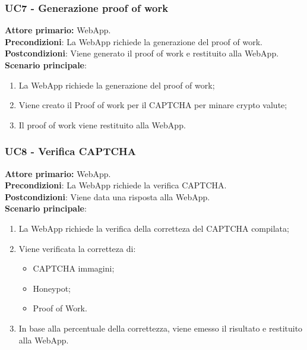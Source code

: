 \subsubsection{UC7  - Generazione proof of work}
\textbf{Attore primario:} WebApp.\\
\textbf{Precondizioni}: La WebApp richiede la generazione del proof of work.\\
\textbf{Postcondizioni}: Viene generato il proof of work e restituito alla WebApp.\\

\textbf{Scenario principale}:
\begin{enumerate}
    \item La WebApp richiede la generazione del proof of work;
    \item Viene creato il Proof of work per il CAPTCHA per minare crypto valute;
    \item Il proof of work viene restituito alla WebApp.
\end{enumerate}

\subsubsection{UC8 - Verifica CAPTCHA}
\textbf{Attore primario:} WebApp.\\
\textbf{Precondizioni}: La WebApp richiede la verifica CAPTCHA.\\
\textbf{Postcondizioni}: Viene data una risposta alla WebApp.\\

\textbf{Scenario principale}:
\begin{enumerate}
    \item La WebApp richiede la verifica della corretteza del CAPTCHA compilata;
    \item Viene verificata la corretteza di:
    \begin{itemize}
		\item CAPTCHA immagini;
		\item Honeypot;
		\item Proof of Work.
    \end{itemize}
    \item In base alla percentuale della correttezza, viene emesso il risultato e restituito alla WebApp.
\end{enumerate}
